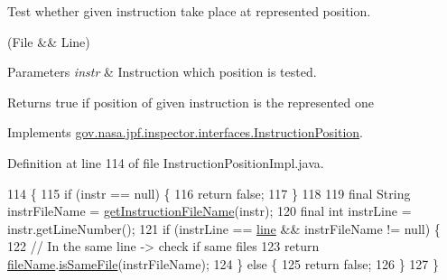 Test whether given instruction take place at represented position. 

(File \&\& Line)


\begin{DoxyParams}{Parameters}
{\em instr} & Instruction which position is tested. \\
\hline
\end{DoxyParams}
\begin{DoxyReturn}{Returns}
true if position of given instruction is the represented one 
\end{DoxyReturn}


Implements \hyperlink{interfacegov_1_1nasa_1_1jpf_1_1inspector_1_1interfaces_1_1_instruction_position_a74e0a143b5cc51a5b147f2f2a2709638}{gov.\+nasa.\+jpf.\+inspector.\+interfaces.\+Instruction\+Position}.



Definition at line 114 of file Instruction\+Position\+Impl.\+java.


\begin{DoxyCode}
114                                                  \{
115     \textcolor{keywordflow}{if} (instr == null) \{
116       \textcolor{keywordflow}{return} \textcolor{keyword}{false};
117     \}
118 
119     \textcolor{keyword}{final} String instrFileName = \hyperlink{classgov_1_1nasa_1_1jpf_1_1inspector_1_1server_1_1breakpoints_1_1_instruction_position_impl_aef02ba722ac5d2bd0674a1062feb4d27}{getInstructionFileName}(instr);
120     \textcolor{keyword}{final} \textcolor{keywordtype}{int} instrLine = instr.getLineNumber();
121     \textcolor{keywordflow}{if} (instrLine == \hyperlink{classgov_1_1nasa_1_1jpf_1_1inspector_1_1server_1_1breakpoints_1_1_instruction_position_impl_ab362ce71d6d351401c64199096a5a75c}{line} && instrFileName != null) \{
122       \textcolor{comment}{// In the same line -> check if same files}
123       \textcolor{keywordflow}{return} \hyperlink{classgov_1_1nasa_1_1jpf_1_1inspector_1_1server_1_1breakpoints_1_1_instruction_position_impl_a516c1bf9f9237fa2da514022d0ed4679}{fileName}.\hyperlink{classgov_1_1nasa_1_1jpf_1_1inspector_1_1utils_1_1expressions_1_1_file_name_ae59cfabe95a82e84be38986d817cf14e}{isSameFile}(instrFileName);
124     \} \textcolor{keywordflow}{else} \{
125       \textcolor{keywordflow}{return} \textcolor{keyword}{false};
126     \}
127   \}
\end{DoxyCode}
